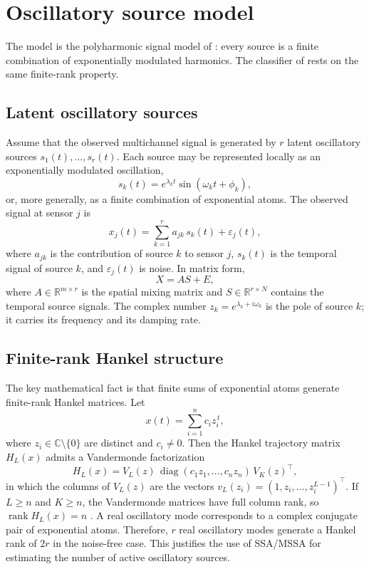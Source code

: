 \documentclass{article}
\begin{document}
\section{Oscillatory source model}\label{sec:oscillatory-source-model}

The model is the polyharmonic signal model of \cite{ref-BernadotteBuchstaber, ref-Bernadotte05}: every source is a finite combination of exponentially modulated harmonics. The classifier of \cite{ref-Bernadotte10} rests on the same finite-rank property.

\subsection{Latent oscillatory sources}\label{sec:latent-oscillatory-sources}

Assume that the observed multichannel signal is generated by $r$ latent oscillatory sources $s_1(t), \dots, s_r(t)$. Each source may be represented locally as an exponentially modulated oscillation, \[
s_k(t) = e^{\lambda_k t} \sin(\omega_k t + \phi_k),
\] or, more generally, as a finite combination of exponential atoms. The observed signal at sensor $j$ is 
\begin{equation} \label{eq:model}
x_j(t) = \sum_{k=1}^{r} a_{jk}\, s_k(t) + \varepsilon_j(t),
\end{equation} where $a_{jk}$ is the contribution of source $k$ to sensor $j$, $s_k(t)$ is the temporal signal of source $k$, and $\varepsilon_j(t)$ is noise. In matrix form, \[
X = AS + E,
\] where $A \in \mathbb{R}^{m \times r}$ is the spatial mixing matrix and $S \in \mathbb{R}^{r \times N}$ contains the temporal source signals. The complex number $z_k = e^{\lambda_k + i\omega_k}$ is the pole of source $k$; it carries its frequency and its damping rate.

\subsection{Finite-rank Hankel structure}\label{sec:finite-rank-hankel-structure}

The key mathematical fact is that finite sums of exponential atoms generate finite-rank Hankel matrices. Let \[
x(t) = \sum_{i=1}^{n} c_i z_i^{\,t},
\] where $z_i \in \mathbb{C} \setminus \{0\}$ are distinct and $c_i \neq 0$. Then the Hankel trajectory matrix $H_L(x)$ admits a Vandermonde factorization \[
H_L(x) = V_L(z)\, \operatorname{diag}(c_1 z_1, \dots, c_n z_n)\, V_K(z)^{\top},
\] in which the columns of $V_L(z)$ are the vectors $v_L(z_i) = (1, z_i, \dots, z_i^{L-1})^{\top}$. If $L \ge n$ and $K \ge n$, the Vandermonde matrices have full column rank, so $\operatorname{rank} H_L(x) = n$ \cite{ref-Golyandina01}. A real oscillatory mode corresponds to a complex conjugate pair of exponential atoms. Therefore, $r$ real oscillatory modes generate a Hankel rank of $2r$ in the noise-free case. This justifies the use of SSA/MSSA for estimating the number of active oscillatory sources.
\end{document}
